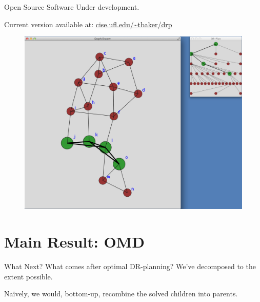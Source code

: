 \documentclass{mySlides}
\newcommand{\n}{\vspace{1em}}
\begin{document}
\begin{frame}{Open Source Software}
    Under development.

    Current version available at: \url{cise.ufl.edu/~tbaker/drp}
    \begin{figure}\centering
        \includegraphics[width=0.65\linewidth]{../../img/screenshots/node_in_drp}
    \end{figure}
\end{frame}

\section{Main Result: OMD}
\begin{frame}{What Next?}
    What comes after optimal DR-planning? We've decomposed to the extent possible.

    \n

    Na{\"i}vely, we would, bottom-up, recombine the solved children into parents.






\end{frame}
\end{document}

